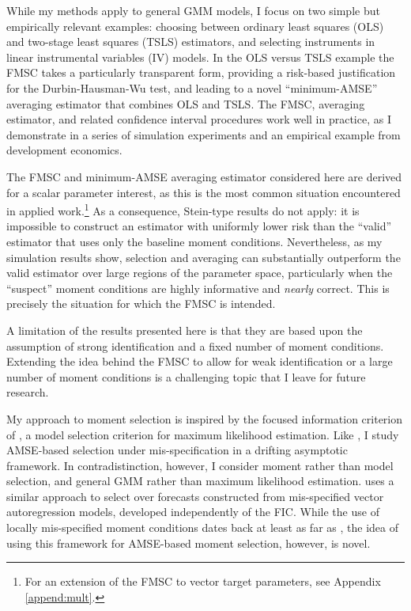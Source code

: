 While my methods apply to general GMM models, I focus on two simple but empirically relevant examples: choosing between ordinary least squares (OLS) and two-stage least squares (TSLS) estimators, and selecting instruments in linear instrumental variables (IV) models. 
In the OLS versus TSLS example the FMSC takes a particularly transparent form, providing a risk-based justification for the Durbin-Hausman-Wu test, and leading to a novel ``minimum-AMSE'' averaging estimator that combines OLS and TSLS.
The FMSC, averaging estimator, and related confidence interval procedures work well in practice, as I demonstrate in a series of simulation experiments and an empirical example from development economics.

The FMSC and minimum-AMSE averaging estimator considered here are derived for a scalar parameter interest, as this is the most common situation encountered in applied work.\footnote{For an extension of the FMSC to vector target parameters, see Appendix \ref{append:mult}.}
As a consequence, Stein-type results do not apply: it is impossible to construct an estimator with uniformly lower risk than the ``valid'' estimator that uses only the baseline moment conditions.
Nevertheless, as my simulation results show, selection and averaging can substantially outperform the valid estimator over large regions of the parameter space, particularly when the ``suspect'' moment conditions are highly informative and \emph{nearly} correct.
This is precisely the situation for which the FMSC is intended.

A limitation of the results presented here is that they are based upon the assumption of strong identification and a fixed number of moment conditions.
Extending the idea behind the FMSC to allow for weak identification or a large number of moment conditions is a challenging topic that I leave for future research.

My approach to moment selection is inspired by the focused information criterion of \citet{ClaeskensHjort2003}, a model selection criterion for maximum likelihood estimation. 
Like \citet{ClaeskensHjort2003}, I study AMSE-based selection under mis-specification in a drifting asymptotic framework. 
In contradistinction, however, I consider moment rather than model selection, and general GMM rather than maximum likelihood estimation.
\cite{Schorfheide2005} uses a similar approach to select over forecasts constructed from mis-specified vector autoregression models, developed independently of the FIC. 
While the use of locally mis-specified moment conditions dates back at least as far as \cite{Newey1985}, the idea of using this framework for AMSE-based moment selection, however, is novel.

